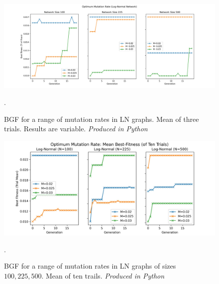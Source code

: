 \documentclass[
	a4paper, %
	10pt, %
	unnumberedsections, %
	twoside, %
]{LTJournalArticle}
\begin{document}
\begin{figure}
	\includegraphics[width=\linewidth]{Figures/sims/mutation/optimum.jpg}
	\caption{BGF for a range of mutation rates in LN graphs. Mean of three trials. Results are variable. \emph{Produced in Python}}. 
	\label{fig:mutation_opt}
\end{figure}

\begin{figure}
	\includegraphics[width=\linewidth]{Figures/sims/mutation/optimum_ten.jpg}
	\caption{BGF for a range of mutation rates in LN graphs of sizes \(100, 225, 500\). Mean of ten trails.  \emph{Produced in Python}}. 
	\label{fig:mutation_opt_2}
\end{figure}
\end{document}
